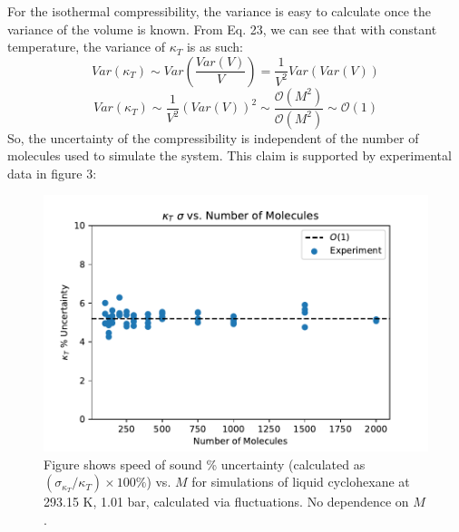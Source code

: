 \documentclass[aps,pre,twocolumn,nofootinbib,superscriptaddress,linenumbers,10pt, draft,tightenlines]{revtex4-1}
\begin{document}
For the isothermal compressibility, the variance is easy to calculate once the variance of the volume is known.  From Eq. 23, we can see that with constant temperature, the variance of $\kappa_T$ is as such:
\begin{equation}
Var(\kappa_T) \sim Var \left( \frac{Var(V)}{V}\right) = \frac{1}{V^2}Var(Var(V))
\end{equation}
\begin{equation}
Var(\kappa_T) \sim \frac{1}{V^2} (Var(V))^2 \sim \frac{\mathcal{O}(M^2)}{\mathcal{O}(M^2)} \sim \mathcal{O}(1)
\end{equation}
So, the uncertainty of the compressibility is independent of the number of molecules used to simulate the system.  This claim is supported by experimental data in figure 3:  
\begin{figure}[H]
\includegraphics[width=\textwidth-40pt]{kt_stdev_vs_number_of_molecules.pdf}
\caption{Figure shows speed of sound \% uncertainty (calculated as $(\sigma_{\kappa_T}/\kappa_T) \times 100 \%$) vs. $M$ for simulations of liquid cyclohexane at 293.15 K, 1.01 bar, calculated via fluctuations. No dependence on $M$.}
\end{figure}
\end{document}

